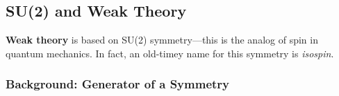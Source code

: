 \documentclass[12pt]{article}
\begin{document}






\subsection{SU(2) and Weak Theory}

\textbf{Weak theory} is based on SU(2) symmetry---this is the analog of spin in quantum mechanics. In fact, an old-timey name for this symmetry is \emph{isospin}. 

\subsubsection{Background: Generator of a Symmetry}
\end{document}
